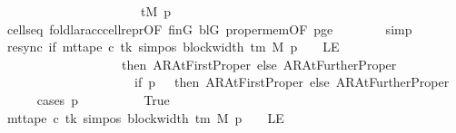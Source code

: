 \begin{isabellebody}
\ \ \ \ \ \ \ \ \ \ \ \ \ \ \ \ \ \ \ \ \ {\isacharequal}{\kern0pt}\ tM\ p{\isachardoublequoteclose}\isanewline
\ \ \ \ \ \ \isamarkupfalse%
\ cells{\isacharunderscore}{\kern0pt}eq\ foldl{\isacharunderscore}{\kern0pt}ar{\isacharunderscore}{\kern0pt}acc{\isacharunderscore}{\kern0pt}cell{\isacharunderscore}{\kern0pt}repr{\isacharbrackleft}{\kern0pt}OF\ finG\ blG\ proper{\isacharunderscore}{\kern0pt}mem{\isacharbrackleft}{\kern0pt}OF\ pge{}{\isacharbrackright}{\kern0pt}{\isacharbrackright}{\kern0pt}\isanewline
\ \ \ \ \ \ \isamarkupfalse%
\ simp\isanewline
\ \ \ \ \isamarkupfalse%
\ resync{\isacharcolon}{\kern0pt}\ {\isachardoublequoteopen}{\isacharparenleft}{\kern0pt}if\ mt{\isacharunderscore}{\kern0pt}tape\ c{\isacharprime}{\kern0pt}\ tk\ {\isacharparenleft}{\kern0pt}sim{\isacharunderscore}{\kern0pt}pos\ {\isacharparenleft}{\kern0pt}block{\isacharunderscore}{\kern0pt}width\ {\isacharparenleft}{\kern0pt}{\isasymGamma}{\isacharunderscore}{\kern0pt}tm\ M{\isacharparenright}{\kern0pt}{\isacharparenright}{\kern0pt}\ p\ {\isacharminus}{\kern0pt}\ {}{\isacharparenright}{\kern0pt}\ {\isacharequal}{\kern0pt}\ LE{}\isanewline
\ \ \ \ \ \ \ \ \ \ \ \ \ \ \ \ \ \ \ then\ AR{\isacharunderscore}{\kern0pt}AtFirstProper\ else\ AR{\isacharunderscore}{\kern0pt}AtFurtherProper{\isacharparenright}{\kern0pt}\isanewline
\ \ \ \ \ \ \ \ \ \ \ \ \ \ \ \ \ \ \ \ {\isacharequal}{\kern0pt}\ {\isacharparenleft}{\kern0pt}if\ p\ {\isacharequal}{\kern0pt}\ {}\ then\ AR{\isacharunderscore}{\kern0pt}AtFirstProper\ else\ AR{\isacharunderscore}{\kern0pt}AtFurtherProper{\isacharparenright}{\kern0pt}{\isachardoublequoteclose}\isanewline
\ \ \ \ \isamarkupfalse%
\ {\isacharparenleft}{\kern0pt}cases\ {\isachardoublequoteopen}p\ {\isacharequal}{\kern0pt}\ {}{\isachardoublequoteclose}{\isacharparenright}{\kern0pt}\isanewline
\ \ \ \ \ \ \isamarkupfalse%
\ True\isanewline
\ \ \ \ \ \ \isamarkupfalse%
\ {\isachardoublequoteopen}mt{\isacharunderscore}{\kern0pt}tape\ c{\isacharprime}{\kern0pt}\ tk\ {\isacharparenleft}{\kern0pt}sim{\isacharunderscore}{\kern0pt}pos\ {\isacharparenleft}{\kern0pt}block{\isacharunderscore}{\kern0pt}width\ {\isacharparenleft}{\kern0pt}{\isasymGamma}{\isacharunderscore}{\kern0pt}tm\ M{\isacharparenright}{\kern0pt}{\isacharparenright}{\kern0pt}\ p\ {\isacharminus}{\kern0pt}\ {}{\isacharparenright}{\kern0pt}\ {\isacharequal}{\kern0pt}\ LE{}{\isachardoublequoteclose}\isanewline

\end{isabellebody}
